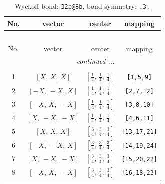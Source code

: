 \documentclass[fleqn,8pt]{jsarticle}
\begin{document}
\renewcommand{\arraystretch}{1.2}
\begin{longtable}{cccc}
\caption{Wyckoff bond: {\tt 32b@8b}, bond symmetry: {\tt .3.}}
 \\
 \hline \hline
No. & vector & center & mapping \\ \hline \endfirsthead

\multicolumn{3}{l}{\tablename\ \thetable{}} \\
 \hline \hline
No. & vector & center & mapping \\ \hline \endhead

 \hline \hline
\multicolumn{3}{r}{\footnotesize\it continued ...} \\ \endfoot

 \hline \hline
\multicolumn{3}{r}{} \\ \endlastfoot

1 & $\left[ X,\, X,\, X \right]$ & $\left[ \frac{1}{4},\, \frac{1}{4},\, \frac{1}{4} \right]$ & {\tt [1,5,9]} \\ \hline
2 & $\left[ - X,\, - X,\, X \right]$ & $\left[ \frac{1}{4},\, \frac{1}{4},\, \frac{1}{4} \right]$ & {\tt [2,7,12]} \\ \hline
3 & $\left[ - X,\, X,\, - X \right]$ & $\left[ \frac{1}{4},\, \frac{1}{4},\, \frac{1}{4} \right]$ & {\tt [3,8,10]} \\ \hline
4 & $\left[ X,\, - X,\, - X \right]$ & $\left[ \frac{1}{4},\, \frac{1}{4},\, \frac{1}{4} \right]$ & {\tt [4,6,11]} \\ \hline
5 & $\left[ X,\, X,\, X \right]$ & $\left[ \frac{3}{4},\, \frac{3}{4},\, \frac{3}{4} \right]$ & {\tt [13,17,21]} \\ \hline
6 & $\left[ - X,\, - X,\, X \right]$ & $\left[ \frac{3}{4},\, \frac{3}{4},\, \frac{3}{4} \right]$ & {\tt [14,19,24]} \\ \hline
7 & $\left[ X,\, - X,\, - X \right]$ & $\left[ \frac{3}{4},\, \frac{3}{4},\, \frac{3}{4} \right]$ & {\tt [15,20,22]} \\ \hline
8 & $\left[ - X,\, X,\, - X \right]$ & $\left[ \frac{3}{4},\, \frac{3}{4},\, \frac{3}{4} \right]$ & {\tt [16,18,23]} \\
\end{longtable}
\renewcommand{\arraystretch}{1.2}
\end{document}
